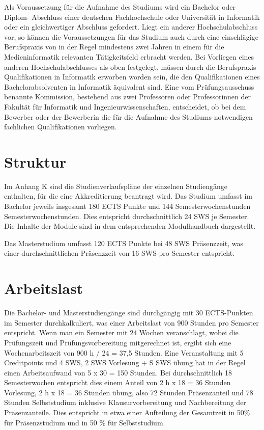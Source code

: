 Als Voraussetzung für die Aufnahme des Studiums wird ein Bachelor oder
Diplom- Abschluss einer deutschen Fachhochschule oder Universität in
Informatik oder ein gleichwertiger Abschluss gefordert. Liegt ein
anderer Hochschulabschluss vor, so können die Voraussetzungen für das
Studium auch durch eine einschlägige Berufspraxis von in der Regel
mindestens zwei Jahren in einem für die Medieninformatik relevanten
Tätigkeitsfeld erbracht werden. Bei Vorliegen eines anderen
Hochschulabschlusses als oben festgelegt, müssen durch die Berufspraxis
Qualifikationen in Informatik erworben worden sein, die den
Qualifikationen eines Bachelorabsolventen in Informatik äquivalent sind.
Eine vom Prüfungsausschuss benannte Kommission, bestehend aus zwei
Professoren oder Professorinnen der Fakultät für Informatik und
Ingenieurwissenschaften, entscheidet, ob bei dem Bewerber oder der
Bewerberin die für die Aufnahme des Studiums notwendigen fachlichen
Qualifikationen vorliegen.

\section{Struktur}\label{struktur}

Im Anhang K sind die Studienverlaufspläne der einzelnen Studiengänge
enthalten, für die eine Akkreditierung beantragt wird. Das Studium
umfasst im Bachelor jeweils insgesamt 180 ECTS Punkte und 144
Semesterwochenstunden Semesterwochenstunden. Dies entspricht
durchschnittlich 24 SWS je Semester. Die Inhalte der Module sind in dem
entsprechenden Modulhandbuch dargestellt.

Das Masterstudium umfasst 120 ECTS Punkte bei 48 SWS Präsenzzeit, was
einer durchschnittlichen Präsenzzeit von 16 SWS pro Semester entspricht.

\section{Arbeitslast}\label{arbeitslast}

Die Bachelor- und Masterstudiengänge sind durchgängig mit 30
ECTS-Punkten im Semester durchkalkuliert, was einer Arbeitslast von 900
Stunden pro Semester entspricht. Wenn man ein Semester mit 24 Wochen
veranschlagt, wobei die Prüfungszeit und Prüfungsvorbereitung
mitgerechnet ist, ergibt sich eine Wochenarbeitszeit von 900 h / 24 =
37,5 Stunden. Eine Veranstaltung mit 5 Creditpoints und 4 SWS, 2 SWS
Vorlesung + S SWS übung hat in der Regel einen Arbeitsaufwand von 5 x 30
= 150 Stunden. Bei durchschnittlich 18 Semesterwochen entspricht dies
einem Anteil von 2 h x 18 = 36 Stunden Vorlesung, 2 h x 18 = 36 Stunden
übung, also 72 Stunden Präsenzanteil und 78 Stunden Selbststudium
inklusive Klausurvorbereitung und Nachbereitung der Präsenzanteile. Dies
entspricht in etwa einer Aufteilung der Gesamtzeit in 50\% für
Präsenzstudium und in 50 \% für Selbststudium.

